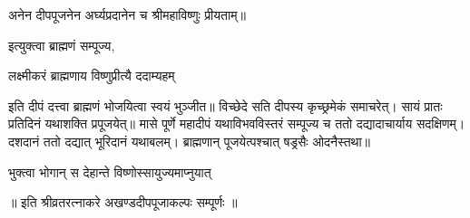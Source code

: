 अनेन दीपपूजनेन अर्घ्यप्रदानेन च श्रीमहाविष्णुः प्रीयताम्॥

इत्युक्त्वा ब्राह्मणं सम्पूज्य,

{लक्ष्मीकरं ब्राह्मणाय विष्णुप्रीत्यै ददाम्यहम्}

इति दीपं दत्त्वा ब्राह्मणं भोजयित्वा स्वयं भुञ्जीत॥ विच्छेदे सति दीपस्य कृच्छ्रमेकं समाचरेत्।
सायं प्रातः प्रतिदिनं यथाशक्ति प्रपूजयेत्॥ मासे पूर्णे महादीपं यथाविभवविस्तरं सम्पूज्य च ततो
दद्यादाचार्याय सदक्षिणम्। दशदानं ततो दद्यात् भूरिदानं यथाबलम्। ब्राह्मणान् पूजयेत्पश्चात्
षड्रसैः ओदनैस्तथा॥

{भुक्त्वा भोगान् स देहान्ते विष्णोस्सायुज्यमाप्नुयात्}

॥ इति श्रीव्रतरत्नाकरे अखण्डदीपपूजाकल्पः सम्पूर्णः ॥

\closesub

\closesection
